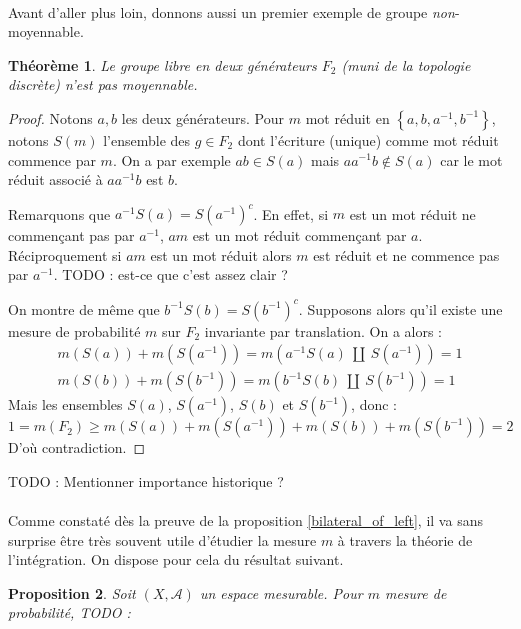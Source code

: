 \documentclass[a4paper,12pt]{article}
\newtheorem{theorem}{Théorème}[section]
\newtheorem{proposition}[theorem]{Proposition}
\newcommand{\set}[1]{\left\{ #1 \right\}}
\newcommand{\inv}{^{-1}}
\newcommand{\compl}{^c}
\newcommand{\TODO}[1]{{\color{red}TODO :} #1}
\begin{document}
\paragraph{}

Avant d'aller plus loin, donnons aussi un premier exemple de groupe \emph{non}-moyennable.

\begin{theorem}
    Le groupe libre en deux générateurs $F_2$ (muni de la topologie discrète) n'est pas moyennable.
\end{theorem}

\begin{proof}
    Notons $a, b$ les deux générateurs. Pour $m$ mot réduit en $\set{a, b, a\inv, b\inv}$, notons 
    $S(m)$ l'ensemble des $g\in F_2$ dont l'écriture (unique) comme mot réduit
    commence par $m$. On a par exemple $ab\in S(a)$ mais $a a\inv b \notin S(a)$ car le mot réduit associé 
    à $a a\inv b$ est $b$.

    Remarquons que $a\inv S(a) = S(a\inv)\compl$. En effet, si $m$ est un mot réduit ne commençant pas par $a\inv$, 
    $am$ est un mot réduit commençant par $a$. Réciproquement si $am$ est un mot réduit alors $m$ est réduit et ne commence 
    pas par $a\inv$. \TODO{est-ce que c'est assez clair ?}

    On montre de même que $b\inv S(b) = S(b\inv)\compl$. Supposons alors qu'il existe une mesure de probabilité $m$ sur 
    $F_2$ invariante par translation. On a alors :
    \begin{gather*}
        m(S(a)) + m(S(a\inv)) = m(a\inv S(a)\ \amalg\ S(a\inv)) = 1 \\
        m(S(b)) + m(S(b\inv)) = m(b\inv S(b)\ \amalg\ S(b\inv)) = 1
    \end{gather*}
    Mais les ensembles $S(a)$, $S(a\inv)$, $S(b)$ et $S(b\inv)$, donc :
    \begin{equation*}
        1 = m(F_2) \ge m(S(a)) + m(S(a\inv)) + m(S(b)) + m(S(b\inv)) = 2
    \end{equation*} 
    D'où contradiction.
\end{proof}

\TODO{Mentionner importance historique ?}

\paragraph{}

Comme constaté dès la preuve de la proposition \ref{bilateral_of_left}, il va sans surprise être très souvent utile d'étudier la mesure $m$ à travers la théorie de l'intégration.
On dispose pour cela du résultat suivant.
\begin{proposition}\label{repr}
    Soit $(X, \mathcal{A})$ un espace mesurable. Pour $m$ mesure de probabilité, \TODO{}
\end{proposition}
\end{document}
